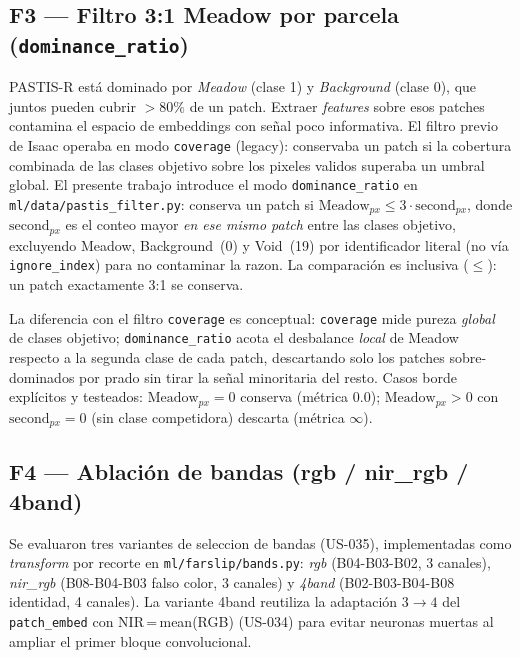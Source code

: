 \subsection{F3 --- Filtro 3:1 Meadow por parcela (\texttt{dominance\_ratio})}
\label{sec:farslip_f3}

PASTIS-R está dominado por \textit{Meadow} (clase 1) y \textit{Background}
(clase 0), que juntos pueden cubrir $>80\%$ de un patch. Extraer
\textit{features} sobre esos patches contamina el espacio de embeddings con
señal poco informativa. El filtro previo de Isaac operaba en modo
\texttt{coverage} (legacy): conservaba un patch si la cobertura combinada de las
clases objetivo sobre los pixeles validos superaba un umbral global. El presente
trabajo introduce el modo \texttt{dominance\_ratio} en
\texttt{ml/data/pastis\_filter.py}: conserva un patch si
$\text{Meadow}_{px} \leq 3 \cdot \text{second}_{px}$, donde
$\text{second}_{px}$ es el conteo mayor \textit{en ese mismo patch} entre las
clases objetivo, excluyendo Meadow, Background~(0) y Void~(19) por identificador
literal (no vía \texttt{ignore\_index}) para no contaminar la razon. La
comparación es inclusiva ($\leq$): un patch exactamente 3:1 se conserva.

La diferencia con el filtro \texttt{coverage} es conceptual: \texttt{coverage}
mide pureza \textit{global} de clases objetivo; \texttt{dominance\_ratio} acota
el desbalance \textit{local} de Meadow respecto a la segunda clase de cada patch,
descartando solo los patches sobre-dominados por prado sin tirar la señal
minoritaria del resto. Casos borde explícitos y testeados:
$\text{Meadow}_{px}=0$ conserva (métrica $0.0$); $\text{Meadow}_{px}>0$ con
$\text{second}_{px}=0$ (sin clase competidora) descarta (métrica $\infty$).

\subsection{F4 --- Ablación de bandas (rgb / nir\_rgb / 4band)}
\label{sec:farslip_f4}

Se evaluaron tres variantes de seleccion de bandas (US-035), implementadas como
\textit{transform} por recorte en \texttt{ml/farslip/bands.py}: \textit{rgb}
(B04-B03-B02, 3 canales), \textit{nir\_rgb} (B08-B04-B03 falso color, 3 canales)
y \textit{4band} (B02-B03-B04-B08 identidad, 4 canales). La variante 4band
reutiliza la adaptación $3\rightarrow4$ del \texttt{patch\_embed} con
NIR\,=\,mean(RGB) (US-034) para evitar neuronas muertas al ampliar el primer
bloque convolucional.

